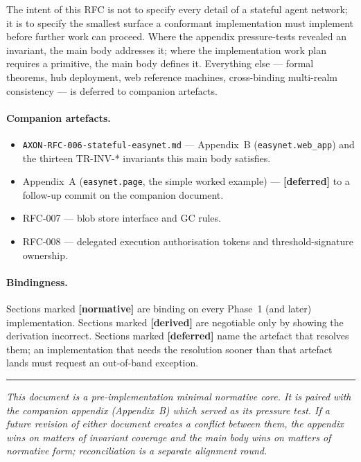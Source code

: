 \documentclass[11pt,a4paper]{article}
\newcommand{\normsv}{\textcolor{normativecolor}{\textbf{[normative]}}\xspace}
\newcommand{\derived}{\textcolor{derivedcolor}{\textbf{[derived]}}\xspace}
\newcommand{\deferred}{\textcolor{deferredcolor}{\textbf{[deferred]}}\xspace}
\theoremstyle{definition}
\begin{document}
The intent of this RFC is not to specify every detail of a
stateful agent network; it is to specify the smallest surface a
conformant implementation must implement before further work can
proceed. Where the appendix pressure-tests revealed an invariant,
the main body addresses it; where the implementation work plan
requires a primitive, the main body defines it. Everything else
--- formal theorems, hub deployment, web reference machines,
cross-binding multi-realm consistency --- is deferred to companion
artefacts.

\paragraph{Companion artefacts.}
\begin{itemize}[leftmargin=2em,itemsep=0.2em]
    \item \texttt{AXON-RFC-006-stateful-easynet.md} ---
    Appendix~B (\texttt{easynet.web\_app}) and the thirteen
    TR-INV-* invariants this main body satisfies.
    \item Appendix~A (\texttt{easynet.page}, the simple worked
    example) --- \deferred{} to a follow-up commit on the
    companion document.
    \item RFC-007 --- blob store interface and GC rules.
    \item RFC-008 --- delegated execution authorisation tokens
    and threshold-signature ownership.
\end{itemize}

\paragraph{Bindingness.}
Sections marked \normsv{} are binding on every Phase~1 (and
later) implementation. Sections marked \derived{} are negotiable
only by showing the derivation incorrect. Sections marked
\deferred{} name the artefact that resolves them; an
implementation that needs the resolution sooner than that
artefact lands must request an out-of-band exception.

\vfill
\hrule
\vspace{0.4em}
\noindent\small
\textit{This document is a pre-implementation minimal normative
core. It is paired with the companion appendix (Appendix~B) which
served as its pressure test. If a future revision of either
document creates a conflict between them, the appendix wins on
matters of invariant coverage and the main body wins on matters
of normative form; reconciliation is a separate alignment round.}
\end{document}
